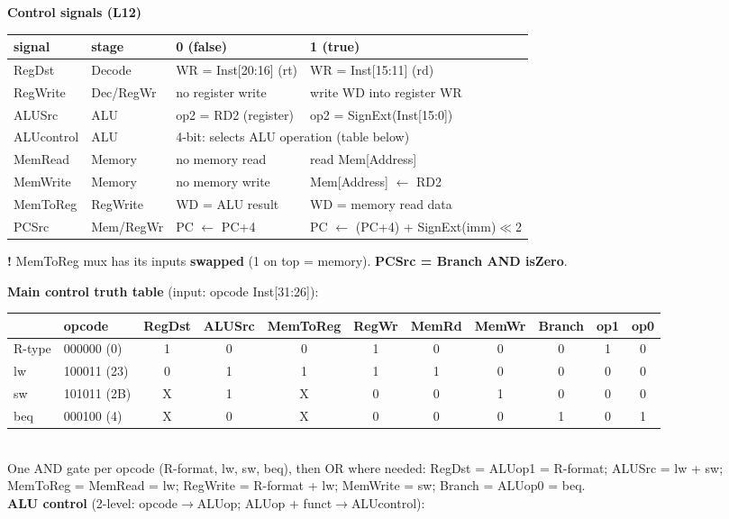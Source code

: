 \documentclass[landscape]{article}
\newcommand{\key}[1]{\textbf{\color{BrickRed}#1}}
\newcommand{\warn}[1]{\par\noindent\colorbox{red!10}{\parbox{\dimexpr\linewidth-2\fboxsep}{\textcolor{red!70!black}{\textbf{!} } #1}}\par}
\newlength{\fu}\setlength{\fu}{5.4pt}
\begin{document}
\begin{minipage}[t]{0.415\textwidth}\vspace{0pt}
{\color{secD}\bfseries Control signals (L12)}\\[1pt]
{\fontsize{5.6}{6.4}\selectfont
\begin{tabular}{@{}l l p{80pt} p{95pt}@{}}\toprule
signal & stage & 0 (false) & 1 (true)\\\midrule
RegDst & Decode & WR = Inst[20:16] (rt) & WR = Inst[15:11] (rd)\\
RegWrite & Dec/RegWr & no register write & write WD into register WR\\
ALUSrc & ALU & op2 = RD2 (register) & op2 = SignExt(Inst[15:0])\\
ALUcontrol & ALU & \multicolumn{2}{l}{4-bit: selects ALU operation (table below)}\\
MemRead & Memory & no memory read & read Mem[Address]\\
MemWrite & Memory & no memory write & Mem[Address] $\leftarrow$ RD2\\
MemToReg & RegWrite & WD = ALU result & WD = memory read data\\
PCSrc & Mem/RegWr & PC $\leftarrow$ PC+4 & PC $\leftarrow$ (PC+4) + SignExt(imm)$\ll$2\\\bottomrule
\end{tabular}
\warn{MemToReg mux has its inputs \textbf{swapped} (1 on top = memory). \key{PCSrc = Branch AND isZero}.}
\textbf{Main control truth table} (input: opcode Inst[31:26]):\\
\begin{tabular}{@{}l l|c c c c c c c|c c@{}}\toprule
 & opcode & RegDst & ALUSrc & MemToReg & RegWr & MemRd & MemWr & Branch & op1 & op0\\\midrule
R-type & 000000 (0) & 1 & 0 & 0 & 1 & 0 & 0 & 0 & 1 & 0\\
lw & 100011 (23) & 0 & 1 & 1 & 1 & 1 & 0 & 0 & 0 & 0\\
sw & 101011 (2B) & X & 1 & X & 0 & 0 & 1 & 0 & 0 & 0\\
beq & 000100 (4) & X & 0 & X & 0 & 0 & 0 & 1 & 0 & 1\\\bottomrule
\end{tabular}\\
One AND gate per opcode (R-format, lw, sw, beq), then OR where needed: RegDst = ALUop1 = R-format; ALUSrc = lw + sw; MemToReg = MemRead = lw; RegWrite = R-format + lw; MemWrite = sw; Branch = ALUop0 = beq.\\[2pt]
\textbf{ALU control} (2-level: opcode$\to$ALUop; ALUop + funct$\to$ALUcontrol):\\
}
\end{minipage}
\end{document}
